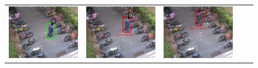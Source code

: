 \begin{figure}[t]
\begin{tabular}{ccccc}
    \includegraphics[scale=0.24]{figures/case-1-suspicious-0225} &
    \includegraphics[scale=0.24]{figures/case-1-suspicious-0249} &
    \includegraphics[scale=0.24]{figures/case-1-suspicious-0267} \\

\end{tabular}
\end{figure}
